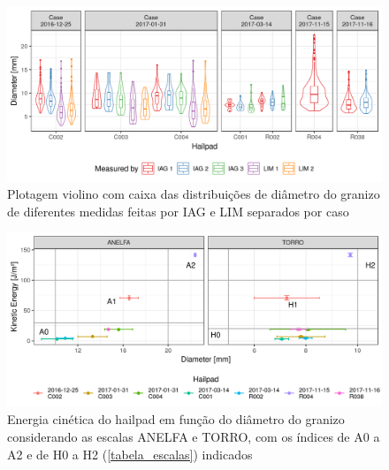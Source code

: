 \begin{figure}[htb]
	\begin{center}
		\caption{Plotagem violino com caixa das distribuições de diâmetro do granizo de diferentes medidas feitas por IAG e LIM separados por caso} 
		\label{distribuicao_tamanho}
		\includegraphics[width=\columnwidth]{../Hailpads_Processing/figures/measures_distribution.png}
	\end{center}
\end{figure}

\begin{figure}[htb]
	\begin{center}
		\caption{Energia cinética do hailpad em função do diâmetro do granizo considerando as escalas ANELFA e TORRO, com os índices de A0 a A2 e de H0 a H2 (\autoref{tabela_escalas}) indicados} 
		\label{intensidade_anelfatorro}
		\includegraphics[width=\columnwidth]{../Hailpads_Processing/figures/data_anelfa_torro.png}
	\end{center}
\end{figure}

